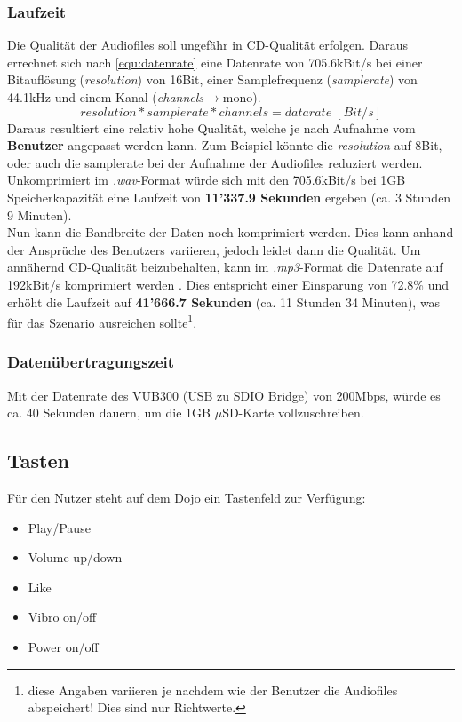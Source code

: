 \subsubsection{Laufzeit}
Die Qualität der Audiofiles soll ungefähr in CD-Qualität erfolgen. Daraus errechnet sich nach \ref{equ:datenrate} eine Datenrate von 705.6kBit/s bei einer Bitauflösung (\textit{resolution}) von 16Bit, einer Samplefrequenz (\textit{samplerate}) von 44.1kHz und einem Kanal (\textit{channels}$\rightarrow$mono).
\begin{equation}
resolution * sample rate * channels = data rate\;[Bit/s]
\label{equ:datenrate}
\end{equation}
Daraus resultiert eine relativ hohe Qualität, welche je nach Aufnahme vom \textbf{Benutzer} angepasst werden kann. Zum Beispiel könnte die \textit{resolution} auf 8Bit, oder auch die samplerate bei der Aufnahme der Audiofiles reduziert werden. Unkomprimiert im \textit{.wav}-Format würde sich mit den 705.6kBit/s bei 1GB Speicherkapazität eine Laufzeit von \textbf{11'337.9 Sekunden} ergeben (ca. 3 Stunden 9 Minuten).
\\[0.5cm]
Nun kann die Bandbreite der Daten noch komprimiert werden. Dies kann anhand der Ansprüche des Benutzers variieren, jedoch leidet dann die Qualität. Um annähernd CD-Qualität beizubehalten, kann im \textit{.mp3}-Format die Datenrate auf 192kBit/s komprimiert werden \cite{koepenick.netkeineAngaben}. Dies entspricht einer Einsparung von 72.8\% und erhöht die Laufzeit auf \textbf{41'666.7 Sekunden} (ca. 11 Stunden 34 Minuten), was für das Szenario ausreichen sollte\footnote{diese Angaben variieren je nachdem wie der Benutzer die Audiofiles abspeichert! Dies sind nur Richtwerte.}.
\subsubsection{Datenübertragungszeit}
Mit der Datenrate des VUB300 (USB zu SDIO Bridge) von 200Mbps, würde es ca. 40 Sekunden dauern, um die 1GB $\mu$SD-Karte vollzuschreiben.
\newpage
\subsection{Tasten}
Für den Nutzer steht auf dem Dojo ein Tastenfeld zur Verfügung:\\
\begin{itemize}
	\item Play/Pause
	\item Volume up/down
	\item Like
	\item Vibro on/off
	\item Power on/off\\
\end{itemize}
